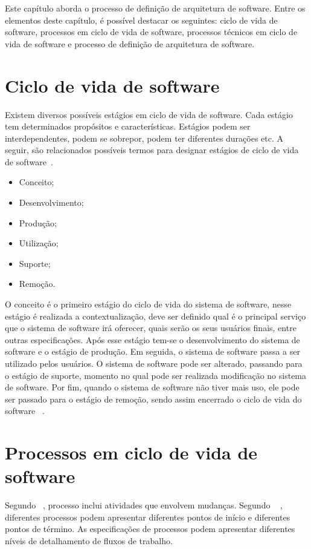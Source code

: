 Este capítulo aborda o processo de definição de arquitetura de software. Entre os elementos deste capítulo, é possível destacar os seguintes: ciclo de vida de software, processos em ciclo de vida de software, processos técnicos em ciclo de vida de software e processo de definição de arquitetura de software.

\section{Ciclo de vida de software}

Existem diversos possíveis estágios em ciclo de vida de software. Cada estágio tem determinados propósitos e características. Estágios podem ser interdependentes, podem se sobrepor, podem ter diferentes durações etc. A seguir, são relacionados possíveis termos para designar estágios de ciclo de vida de software~\cite{ISO_247483}. 

\begin{itemize}
    \item Conceito;
    \item Desenvolvimento;
    \item Produção;
    \item Utilização;
    \item Suporte;
    \item Remoção.
\end{itemize}

O conceito é o primeiro estágio do ciclo de vida do sistema de software, nesse estágio é realizada a contextualização, deve ser definido qual é o principal serviço que o sistema de software irá oferecer, quais serão os seus usuários finais, entre outras especificações. Após esse estágio tem-se o desenvolvimento do sistema de software e o estágio de produção. Em seguida, o sistema de software passa a ser utilizado pelos usuários. O sistema de software pode ser alterado, passando para o estágio de suporte, momento no qual pode ser realizada modificação no sistema de software. Por fim, quando o sistema de software não tiver mais uso, ele pode ser passado para o estágio de remoção, sendo assim encerrado o ciclo de vida do software ~\cite{ISO_247483}.

\section{Processos em ciclo de vida de software}

Segundo ~\cite{Sommerville_2011_texbook}, processo inclui atividades que envolvem mudanças. Segundo ~\cite{Sevocab} , diferentes processos podem apresentar diferentes pontos de início e diferentes pontos de término. As especificações de processos podem apresentar diferentes níveis de detalhamento de fluxos de trabalho.

